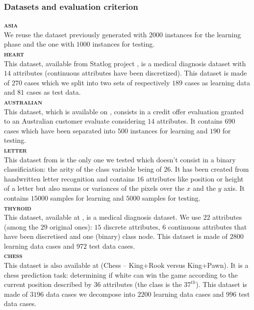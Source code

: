 \subsubsection*{Datasets and evaluation criterion}
\textbf{\textsc{asia}}~\\
We reuse the dataset previously generated with $2000$ instances for the learning phase and the one with $1000$ instances for testing.
~\\\textbf{\textsc{heart}}~\\
This dataset, available from Statlog project \cite{Sut92,Mic94}, is a medical diagnosis dataset with $14$ attributes (continuous attributes have been discretized).
This dataset is made of $270$ cases which we split into two sets of respectively $189$ cases as learning data and $81$ cases as test data.
~\\\textbf{\textsc{australian}}~\\
This dataset, which is available on \cite{Mic94}, consists in a credit offer evaluation granted to an Australian customer evaluate considering $14$ attributes.
It contains $690$ cases which have been separated into $500$ instances for learning and $190$ for testing.
~\\\textbf{\textsc{letter}}~\\
This dataset from \cite{Mic94} is the only one we tested which doesn't consist in a binary classificiation: the arity of the class variable being of $26$.
It has been created from handwritten letter recognition and contains $16$ attributes like position or height of a letter but also means or variances of the pixels over the $x$ and the $y$ axis.
It contains $15000$ samples for learning and $5000$ samples for testing.
~\\\textbf{\textsc{thyroid}}~\\
This dataset, available at \cite{UCI}, is a medical diagnosis dataset. We use $22$ attributes (among the $29$ original ones): $15$ discrete attributes, $6$ continuous attributes that have been discretised and one (binary) class node. This dataset is made of $2800$ learning data cases and $972$ test data cases.
~\\\textbf{\textsc{chess}}~\\
This dataset is also available at \cite{UCI} (Chess -- King+Rook versus King+Pawn). It is a chess prediction task: determining if white can win the game according to the current position described by $36$ attributes (the class is the $37^{th}$). This dataset is made of $3196$ data cases we decompose into $2200$ learning data cases and $996$ test data cases.
\pagebreak

